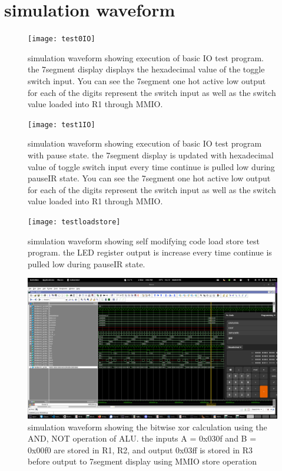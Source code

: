 \documentclass[a4paper,12pt]{report}
\begin{document}
\section{simulation waveform}
\label{sec: simulation waveform}
\begin{figure}[H]
    \begin{center}
        \texttt{[image: test0IO]}
        \caption{simulation waveform showing execution of basic IO test program. the 7segment display displays the hexadecimal value of the toggle switch input. You can see the 7segment one hot active low output for each of the digits represent the switch input as well as the switch value loaded into R1 through MMIO.}   
    \end{center}
\end{figure}
\begin{figure}[H]
    \begin{center}
        \texttt{[image: test1IO]}
        \caption{simulation waveform showing execution of basic IO test program with pause state. the 7segment display is updated with hexadecimal value of toggle switch input every time continue is pulled low during pauseIR state. You can see the 7segment one hot active low output for each of the digits represent the switch input as well as the switch value loaded into R1 through MMIO.}   
    \end{center}
\end{figure}
\begin{figure}[H]
    \begin{center}
        \texttt{[image: testloadstore]}
        \caption{simulation waveform showing self modifying code load store test program. the LED register output is increase every time continue is pulled low during pauseIR state.}   
    \end{center}
\end{figure}
\begin{figure}[H]
    \begin{center}
        \includegraphics[scale=.3]{xor_asm}
        \caption{simulation waveform showing the bitwise xor calculation using the AND, NOT operation of ALU. the inputs A = 0x030f and B = 0x00f0 are stored in R1, R2, and output 0x03ff is stored in R3 before output to 7segment display using MMIO store operation}   
    \end{center}
\end{figure}
\end{document}
